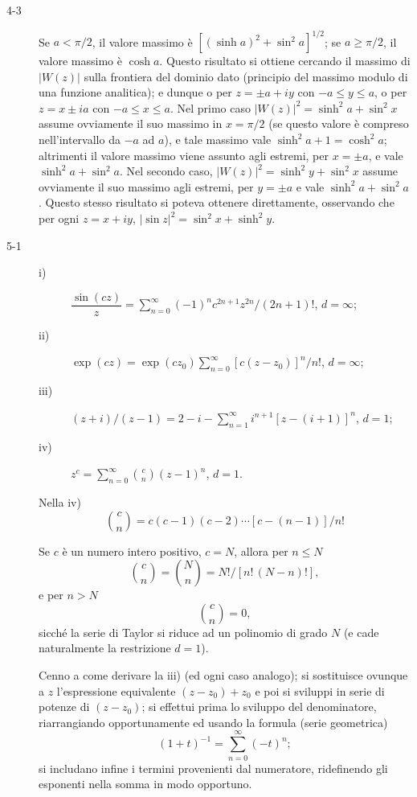 \documentclass[11pt, a4paper]{book}
\numberwithin{equation}{section}
\begin{document}
\begin{description}
\item[4-3] Se $a < \pi/2$, il valore massimo è $\left[(\sinh a)^2 + \sin^2 a\right]^{1/2}$; se $a \geq \pi/2$, il valore massimo è $\cosh a$. Questo risultato si ottiene cercando il massimo di $|W(z)|$ sulla frontiera del dominio dato (principio del massimo modulo di una funzione analitica); e dunque o per $z = \pm a + iy$ con $-a \leq y \leq a$, o per $z = x \pm ia$ con $-a \leq x \leq a$. Nel primo caso $|W(z)|^2 = \sinh^2 a + \sin^2 x$ assume ovviamente il suo massimo in $x = \pi/2$ (se questo valore è compreso nell'intervallo da $-a$ ad $a$), e tale massimo vale $\sinh^2 a + 1 = \cosh^2 a$; altrimenti il valore massimo viene assunto agli estremi, per $x = \pm a$, e vale $\sinh^2 a + \sin^2 a$. Nel secondo caso, $|W(z)|^2 = \sinh^2 y + \sin^2 x$ assume ovviamente il suo massimo agli estremi, per $y = \pm a$ %
e vale $\sinh^2 a + \sin^2 a$. Questo stesso risultato si poteva ottenere direttamente, osservando che per ogni $z = x + iy$, $|\sin z|^2 = \sin^2 x + \sinh^2 y$.

\item[5-1] 
\begin{description}
\item[i)] $\dfrac{\sin(cz)}{z} = \sum_{n=0}^{\infty} (-1)^n c^{2n+1} z^{2n}/(2n+1)!$, \quad $d = \infty$;
\item[ii)] $\exp(cz) = \exp(cz_0) \sum_{n=0}^{\infty} \left[c(z-z_0)\right]^n/n!$, \quad $d = \infty$;
\item[iii)] $(z+i)/(z-1) = 2 - i - \sum_{n=1}^{\infty} i^{n+1}\left[z - (i+1)\right]^n$, \quad $d = 1$; %
\item[iv)] $z^c = \sum_{n=0}^{\infty} \binom{c}{n}(z-1)^n$, \quad $d = 1$.
\end{description}

Nella iv)
$$\binom{c}{n} = c(c-1)(c-2)\cdots\left[c-(n-1)\right]/n!$$

Se $c$ è un numero intero positivo, $c = N$, allora per $n \leq N$
$$\binom{c}{n} = \binom{N}{n} = N!/\left[n!\,(N-n)!\right],$$
e per $n > N$
$$\binom{c}{n} = 0,$$
sicché la serie di Taylor si riduce ad un polinomio di grado $N$ (e cade naturalmente la restrizione $d=1$).

Cenno a come derivare la iii) (ed ogni caso analogo); si sostituisce ovunque a $z$ l'espressione equivalente $(z - z_0) + z_0$ e poi si sviluppi in serie di potenze di $(z - z_0)$; si effettui prima lo sviluppo del denominatore, riarrangiando opportunamente ed usando la formula (serie geometrica)
$$(1+t)^{-1} = \sum_{n=0}^{\infty} (-t)^n;$$
si includano infine i termini provenienti dal numeratore, ridefinendo gli esponenti nella somma in modo opportuno.


\end{description}
\end{document}
